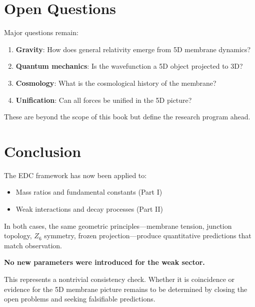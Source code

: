 \section{Open Questions}

Major questions remain:

\begin{enumerate}
\item \textbf{Gravity}: How does general relativity emerge from 5D membrane dynamics?

\item \textbf{Quantum mechanics}: Is the wavefunction a 5D object projected to 3D?

\item \textbf{Cosmology}: What is the cosmological history of the membrane?

\item \textbf{Unification}: Can all forces be unified in the 5D picture?
\end{enumerate}

These are beyond the scope of this book but define the research program ahead.

\section{Conclusion}

The EDC framework has now been applied to:
\begin{itemize}[nosep]
\item Mass ratios and fundamental constants (Part I)
\item Weak interactions and decay processes (Part II)
\end{itemize}

In both cases, the same geometric principles---membrane tension,
junction topology, $Z_6$ symmetry, frozen projection---produce
quantitative predictions that match observation.

\textbf{No new parameters were introduced for the weak sector.}

This represents a nontrivial consistency check. Whether it is coincidence
or evidence for the 5D membrane picture remains to be determined by
closing the open problems and seeking falsifiable predictions.

